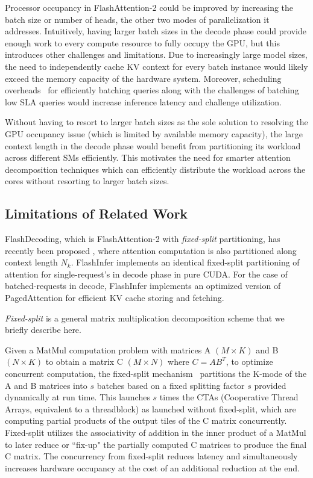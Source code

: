Processor occupancy in FlashAttention-2 could be improved by increasing the batch size or number of heads, the other two modes of parallelization it addresses. Intuitively, having larger batch sizes in the decode phase could provide enough work to every compute resource to fully occupy the GPU, but this introduces other challenges and limitations. Due to increasingly large model sizes, the need to independently cache KV context for every batch instance would likely exceed the memory capacity of the hardware system. Moreover, scheduling overheads~\cite{orca22} for efficiently batching queries along with the challenges of batching low SLA queries would increase inference latency and challenge utilization. 

Without having to resort to larger batch sizes as the sole solution to resolving the GPU occupancy issue (which is limited by available memory capacity), the large context length in the decode phase would benefit from partitioning its workload across different SMs efficiently. This motivates the need for smarter attention decomposition techniques which can efficiently distribute the workload across the cores without resorting to larger batch sizes. 

\subsection{Limitations of Related Work}
\label{subsec:fixedsplit}

FlashDecoding, which is FlashAttention-2 with \emph{fixed-split} partitioning, has recently been proposed \cite{flashdecoding,hong2024flashdecoding,githubGitHubDaoAILabflashattention}, where attention computation is also partitioned along context length $N_k$. FlashInfer\cite{flashinfer} implements an identical fixed-split partitioning of attention for single-request's in decode phase in pure CUDA. For the case of batched-requests in decode, FlashInfer implements an optimized version of PagedAttention for efficient KV cache storing and fetching.

\emph{Fixed-split} is a general matrix multiplication decomposition scheme that we briefly describe here. 

Given a MatMul computation problem with matrices A $(M \times K)$ and B $(N \times K)$ to obtain a matrix C $(M \times N)$ where $C = AB^T$, to optimize concurrent computation, the fixed-split mechanism~\cite{cutlassgithub} partitions the K-mode of the A and B matrices into $s$ batches based on a fixed splitting factor $s$ provided dynamically at run time. This launches $s$ times the CTAs (Cooperative Thread Arrays, equivalent to a threadblock) as launched without fixed-split, which are computing partial products of the output tiles of the C matrix concurrently. Fixed-split utilizes the associativity of addition in the inner product of a MatMul to later reduce or ``fix-up" the partially computed C matrices to produce the final C matrix. The concurrency from fixed-split reduces latency and simultaneously increases hardware occupancy at the cost of an additional reduction at the end. 

